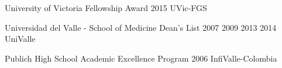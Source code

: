 \begin{cvhonors}
  \cvhonor
    {University of Victoria Fellowship Award} %
    {2015} %
    {UVic-FGS} %
    {} %

  \cvhonor
    {Universidad del Valle - School of Medicine Dean's List} %
    {2007 2009 2013 2014} %
    {UniValle} %
    {} %

  \cvhonor
    {Publich High School Academic Excellence Program} %
    {2006} %
    {InfiValle-Colombia} %
    {} %


\end{cvhonors}







